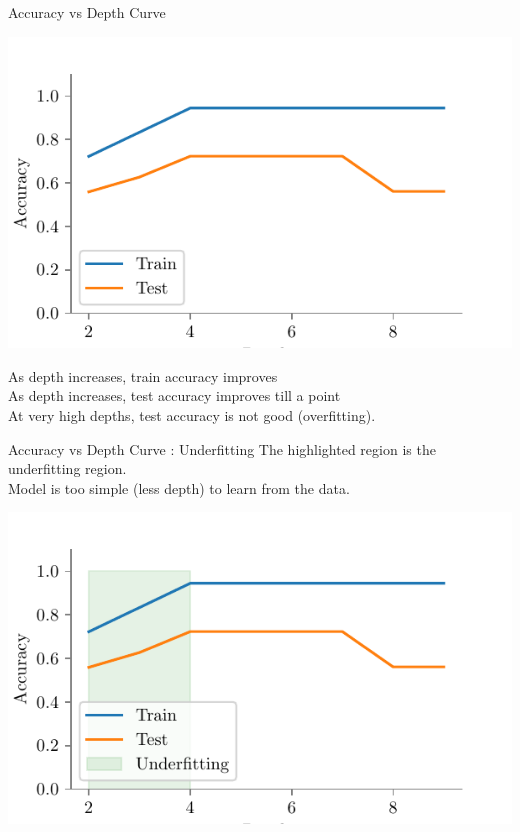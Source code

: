 \documentclass{beamer}
\begin{document}
\begin{frame}{Accuracy vs Depth Curve}
\begin{center}
\includegraphics[scale=0.55]{../figures/decision-trees/bias-variance-accuracy-vs-depth.pdf}
\end{center}
\pause As depth increases, train accuracy improves\\
\pause As depth increases, test accuracy improves till a point\\
\pause At very high depths, test accuracy is not good (overfitting). 

\end{frame}

\begin{frame}{Accuracy vs Depth Curve : Underfitting}
The highlighted region is the underfitting region.\\
Model is too simple (less depth) to learn from the data. 
\begin{center}
\includegraphics{../figures/decision-trees/bias-variance-accuracy-vs-depth-underfitting.pdf}
\end{center}
\end{frame}
\end{document}
